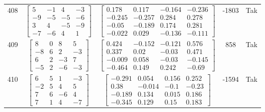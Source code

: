 \documentclass[a4paper,12pt]{article}
\begin{document}
\begin{tabular}{c c c c c}
408
&
$\begin{bmatrix} 5 & -1 & 4 & -3 \\ -9 & -5 & -5 & -6 \\ 3 & 4 & -5 & -9 \\ -7 & -6 & 4 & 1 \end{bmatrix}$
&
$\begin{bmatrix} 0.178 & 0.117 & -0.164 & -0.236 \\ -0.245 & -0.257 & 0.284 & 0.278 \\ -0.05 & -0.189 & 0.174 & 0.281 \\ -0.022 & 0.029 & -0.136 & -0.111 \end{bmatrix}$
&
-1803
&
Tak
\\
409
&
$\begin{bmatrix} 8 & 0 & 8 & 5 \\ -8 & 6 & 2 & -3 \\ 6 & 2 & -3 & 7 \\ -5 & 2 & -6 & -3 \end{bmatrix}$
&
$\begin{bmatrix} 0.424 & -0.152 & -0.121 & 0.576 \\ 0.337 & 0.02 & -0.03 & 0.471 \\ -0.009 & 0.058 & -0.03 & -0.145 \\ -0.464 & 0.149 & 0.242 & -0.69 \end{bmatrix}$
&
858
&
Tak
\\
410
&
$\begin{bmatrix} 6 & 5 & 1 & -3 \\ -2 & 5 & 4 & 5 \\ 7 & 6 & -6 & 4 \\ 7 & 1 & 4 & -7 \end{bmatrix}$
&
$\begin{bmatrix} -0.291 & 0.054 & 0.156 & 0.252 \\ 0.38 & -0.014 & -0.1 & -0.23 \\ -0.189 & 0.134 & 0.015 & 0.186 \\ -0.345 & 0.129 & 0.15 & 0.183 \end{bmatrix}$
&
-1594
&
Tak
\\
\end{tabular} \egroup \newpage
\end{document}
